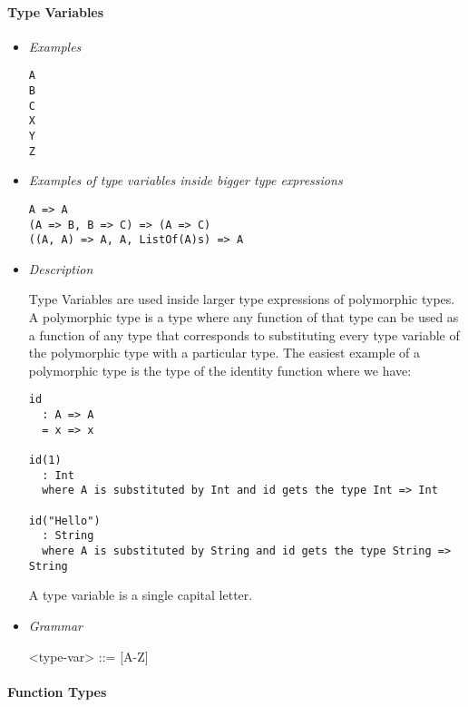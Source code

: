 \documentclass{article}
\begin{document}
\paragraph{Type Variables}

\begin{itemize}
\item \textit{Examples}
\begin{verbatim}
A
B
C
X 
Y
Z
\end{verbatim}

\item \textit{Examples of type variables inside bigger type expressions}
\begin{verbatim}
A => A
(A => B, B => C) => (A => C)
((A, A) => A, A, ListOf(A)s) => A
\end{verbatim}

\item \textit{Description}

Type Variables are used inside larger type expressions of polymorphic types. A
polymorphic type is a type where any function of that type can be used as a
function of any type that corresponds to substituting every type variable of
the polymorphic type with a particular type. The easiest example of a
polymorphic type is the type of the identity function where we have:
\begin{verbatim}
id
  : A => A
  = x => x

id(1)
  : Int
  where A is substituted by Int and id gets the type Int => Int

id("Hello")
  : String
  where A is substituted by String and id gets the type String => String
\end{verbatim}

A type variable is a single capital letter.

\item \textit{Grammar}
\begin{grammar}
<type-var> ::= [A-Z] \\ 
\end{grammar}
\end{itemize}

\paragraph{Function Types}
\end{document}
